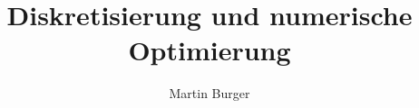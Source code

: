 \usepackage[T1]{fontenc}
\usepackage{lmodern}
\author{Martin Burger}
\title{Diskretisierung und numerische Optimierung}
\setpdfinfo %

\usepackage{styles/fau-colors}
\usepackage[thmboxing=styleA,
			boxingstyle=styleA,
			chapterheader=styleA, 
			footerheader=styleA,
			]{styles/fau-appearence}
\usepackage{styles/fau-symbols}
%
\usepackage{kantlipsum}
\usepackage[totoc]{idxlayout}
\usepackage{algorithmic}

